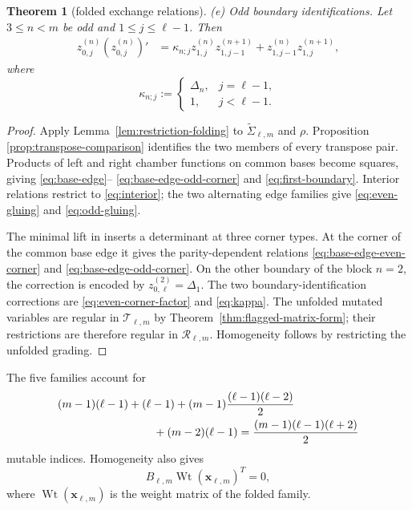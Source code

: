 \documentclass[11pt]{amsart}
\newtheorem{theorem}{Theorem}[section]
\theoremstyle{definition}
\theoremstyle{remark}
\newcommand{\cR}{\mathcal R}
\newcommand{\cT}{\mathcal T}
\begin{document}
\begin{theorem}[folded exchange relations]
\smallskip
\noindent\emph{(e) Odd boundary identifications.}  Let $3\le n<m$ be odd and
$1\le j\le\ell-1$.  Then
\begin{align}
 z_{0,j}^{(n)}(z_{0,j}^{(n)})'
 &=\kappa_{n;j}z_{1,j}^{(n)}z_{1,j-1}^{(n+1)}
+z_{1,j-1}^{(n)}z_{1,j}^{(n+1)},
 \label{eq:odd-gluing}
\end{align}
where
\begin{equation}
 \kappa_{n;j}:=
 \begin{cases}
  \Delta_n,&j=\ell-1,\\
  1,&j<\ell-1.
 \end{cases}
 \label{eq:kappa}
\end{equation}
\end{theorem}

\begin{proof}
Apply Lemma~\ref{lem:restriction-folding} to
$\widetilde\Sigma_{\ell,m}$ and $\rho$.  Proposition
\ref{prop:transpose-comparison} identifies the two members of every
transpose pair.  Products of left and right chamber functions on common
bases become squares, giving \eqref{eq:base-edge}--
\eqref{eq:base-edge-odd-corner} and \eqref{eq:first-boundary}.  Interior relations restrict to
\eqref{eq:interior}; the two alternating edge families give
\eqref{eq:even-gluing} and \eqref{eq:odd-gluing}.

The minimal lift in \cite{FeiKroneckerII} inserts a determinant at three
corner types.
At the corner of the common base edge it gives the parity-dependent relations
\eqref{eq:base-edge-even-corner} and
\eqref{eq:base-edge-odd-corner}.  On the other boundary of the block $n=2$,
the correction is encoded by $z_{0,\ell}^{(2)}=\Delta_1$.  The two boundary-identification
corrections are \eqref{eq:even-corner-factor} and \eqref{eq:kappa}.  The unfolded mutated
variables are regular in $\cT_{\ell,m}$ by
Theorem~\ref{thm:flagged-matrix-form}; their restrictions are therefore regular
in $\cR_{\ell,m}$.  Homogeneity follows by restricting the unfolded grading.
\end{proof}

The five families account for
\begin{align*}
 &(m-1)(\ell-1)+(\ell-1)
 +(m-1)\frac{(\ell-1)(\ell-2)}2\\
 &\hspace{30mm}+(m-2)(\ell-1)
 =\frac{(m-1)(\ell-1)(\ell+2)}2
\end{align*}
mutable indices.  Homogeneity also gives
\[ B_{\ell,m}\operatorname{Wt}(\mathbf x_{\ell,m})^T=0, \]
where $\operatorname{Wt}(\mathbf x_{\ell,m})$ is the weight matrix of the
folded family.
\end{document}
